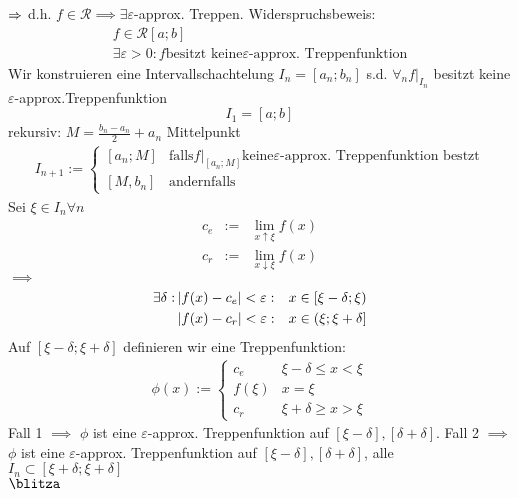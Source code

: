 \begin{Bew}{$\Rightarrow$}
  d.h. $f\in \mathcal{R}\implies \exists \varepsilon$-approx. Treppen. Widerspruchsbeweis:
  \begin{align*}
    f\in \mathcal{R}[a;b]\\
    \exists \varepsilon >0: f \text{besitzt keine} \varepsilon \text{-approx. Treppenfunktion}
  \end{align*}
  Wir konstruieren eine Intervallschachtelung $I_n=[a_n;b_n]$ s.d. $\forall_n f|_{I_n}$ besitzt keine $\varepsilon$-approx.Treppenfunktion
  \[I_1=[a;b]\]
  rekursiv: $M=\frac{b_n-a_n}{2} +a_n$ Mittelpunkt
  \begin{align*}
    I_{n+1}:=\begin{cases}
      [a_n;M]&\text{falls} f|_{[a_n;M]}\text{keine} \varepsilon \text{-approx. Treppenfunktion bestzt}\\ [M,b_n]& \text{andernfalls}        
    \end{cases}
  \end{align*}
  Sei $\xi\in I_n \forall n$
  \begin{align*}
    c_e&:=&\lim_{x\uparrow \xi} f(x)\\
    c_r&:=&\lim_{x\downarrow \xi} f(x)
  \end{align*}
  $\implies$
  \begin{align*}
    \exists \delta:&\left| f(x)-c_e \right|<\varepsilon:&x\in\left[\xi-\delta;\xi\right)\\
    &\left| f(x)-c_r \right|<\varepsilon:&x\in\left(\xi;\xi+\delta\right]\\
  \end{align*}
  Auf $[\xi-\delta;\xi+\delta]$ definieren wir eine Treppenfunktion:
  \begin{align*}
    \phi(x):=\begin{cases}
      c_e&\xi-\delta\leq x< \xi\\
      f(\xi)&x=\xi\\
      c_r&\xi+\delta\geq x>\xi
    \end{cases}
  \end{align*}
  Fall 1 $\implies$ $\phi$ ist eine $\varepsilon$-approx. Treppenfunktion auf $[\xi-\delta],[\delta+\delta]$. Fall 2 $\implies$ $\phi$ ist eine $\varepsilon$-approx. Treppenfunktion auf $[\xi-\delta],[\delta+\delta]$, alle $I_n \subset[\xi+\delta;\xi+\delta]$\\
  $\blitza$
\end{Bew}
